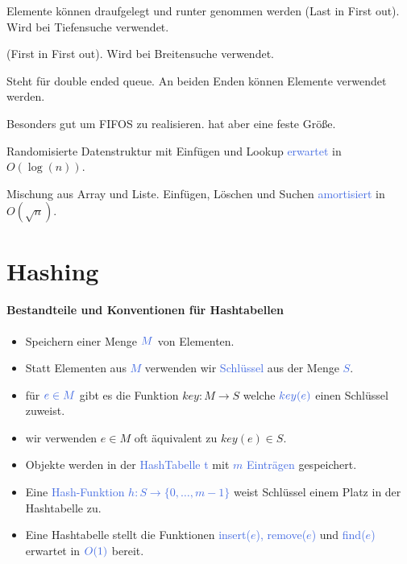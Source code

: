 \documentclass[11pt]{article}
\def \texcol{RoyalBlue}
\begin{document}
\begin{description}[leftmargin=!,labelwidth=\widthof{\bfseries Cyclic Array}]
\item[Stack\index{Stack}] Elemente können draufgelegt und runter genommen werden (Last in First out). Wird bei Tiefensuche verwendet.
\item[FIFO queue\index{FIFO queue}] (First in First out). Wird bei Breitensuche verwendet.
\item[Deque\index{Deque}] Steht für double ended queue. An beiden Enden können Elemente verwendet werden.
\item[Cyclic Array\index{Cyclic Array}] Besonders gut um FIFOS zu realisieren. hat aber eine feste Größe.
\item[Skip List\index{Skip List}] Randomisierte Datenstruktur mit Einfügen und Lookup \textcolor{\texcol}{erwartet} in $O(\log(n))$.
\item[Hotlist\index{Hotlist}] Mischung aus Array und Liste. Einfügen, Löschen und Suchen \textcolor{\texcol}{amortisiert} in $O(\sqrt{n})$.
\end{description}

\section{Hashing}

\paragraph{Bestandteile und Konventionen für Hashtabellen}

\begin{itemize}
\item Speichern einer Menge $\textcolor{\texcol}{M}$ von Elementen.
\item Statt Elementen aus \textcolor{\texcol}{$M$} verwenden wir \textcolor{\texcol}{Schlüssel} aus der Menge \textcolor{\texcol}{$S$}.
\item für $\textcolor{\texcol}{e\in M}$ gibt es die Funktion $key\colon M \to S $ welche $\textcolor{\texcol}{key(e)}$ einen Schlüssel zuweist.
\item wir verwenden $e\in M$ oft äquivalent zu $key(e)\in S$.
\item Objekte werden in der \textcolor{\texcol}{HashTabelle t} mit \textcolor{\texcol}{$m$ Einträgen} gespeichert.
\item Eine \textcolor{\texcol}{Hash-Funktion $h\colon S \to \{0,\dots ,m-1\}$} weist Schlüssel einem Platz in der Hashtabelle zu.
\item Eine Hashtabelle stellt die Funktionen \textcolor{\texcol}{insert($e$), remove($e$)} und \textcolor{\texcol}{find($e$)} erwartet in $\textcolor{\texcol}{O(1)}$ bereit.
\end{itemize}
\end{document}
